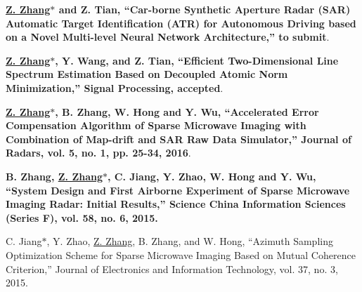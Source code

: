 \documentclass[paper=a4,fontsize=11pt]{scrartcl}
\begin{document}
\begin{description}
	



\item \textbf{\underline{Z. Zhang$\ast$} and Z. Tian, ``Car-borne Synthetic Aperture Radar (SAR) Automatic Target Identification (ATR) for Autonomous Driving based on a Novel Multi-level Neural Network Architecture,'' to submit}.
	


\item \textbf{\underline{Z. Zhang$\ast$}, Y. Wang, and Z. Tian, ``Efficient Two-Dimensional Line Spectrum Estimation Based on Decoupled Atomic Norm Minimization,'' Signal Processing, accepted}.


\item \textbf{\underline{Z. Zhang$\ast$}, B. Zhang, W. Hong and Y. Wu, ``Accelerated Error Compensation Algorithm of Sparse Microwave Imaging with Combination of Map-drift and SAR Raw Data Simulator,'' Journal of Radars, vol. 5, no. 1, pp. 25-34, 2016}.

\item \textbf{B. Zhang, \underline{Z. Zhang$\ast$}, C. Jiang, Y. Zhao, W. Hong and Y. Wu, ``System Design and First Airborne Experiment of Sparse Microwave Imaging Radar: Initial Results,'' Science China Information Sciences (Series F), vol. 58, no. 6, 2015.}

\item C. Jiang$\ast$, Y. Zhao, \underline{Z. Zhang}, B. Zhang, and W. Hong, ``Azimuth Sampling Optimization Scheme for Sparse Microwave Imaging Based on Mutual Coherence Criterion,'' Journal of Electronics and Information Technology, vol. 37, no. 3, 2015.


\end{description}
\end{document}
